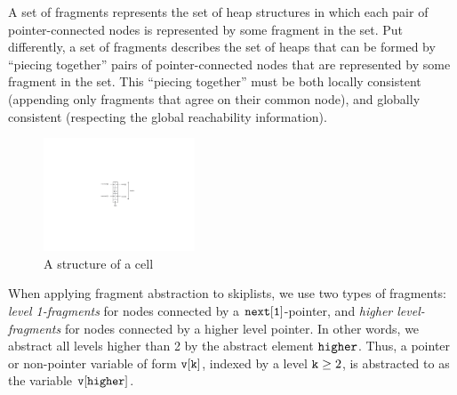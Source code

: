 A set of fragments represents the set of heap
structures in which each pair of pointer-connected nodes is represented by some
fragment in the set.
Put differently, a set of fragments describes the set of heaps that can be formed by
``piecing together'' pairs of pointer-connected nodes that are represented
by some fragment in the set. This ``piecing together'' must
be both locally consistent (appending only fragments that agree on their
common node), and globally consistent (respecting the global reachability
information).
\begin{figure} 
\vspace{-30pt}
  \begin{center}
 \includegraphics[width=0.4\textwidth, trim={13cm 10cm 12cm 9cm}, clip]{skipcell.pdf}  
\vspace*{-0.6cm}
\caption{A structure of a cell
}
    \label{skipcell}
  \end{center}
  \vspace{-40pt}
  \vspace{1pt}
\end{figure}
When applying fragment abstraction to skiplists, we  use two types of fragments:
{\em level 1-fragments} for
nodes connected by a $\tt next[1]$-pointer, and {\em higher level-fragments} for
nodes connected by a higher level pointer. In other words, we abstract all levels
higher than 2 by the abstract element $\tt higher$. Thus, a pointer or
non-pointer variable of form $\tt v[k]$, indexed by a level ${\tt k} \geq 2$, is
abstracted to as the variable $\tt v[higher]$.

